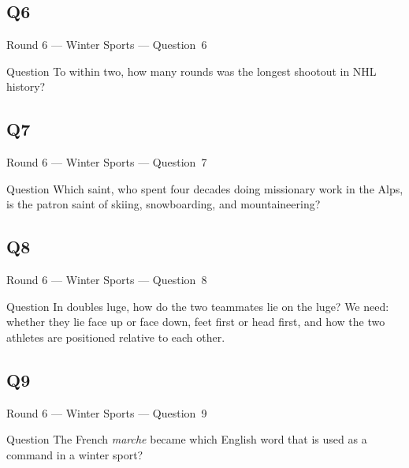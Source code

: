 \documentclass[11pt]{beamer}
\begin{document}
\subsection*{Q6}
\begin{frame}[t]{Round 6 --- Winter Sports --- \mbox{Question 6}}
    \vspace{-0.5em}
    \begin{block}{Question}
        To within two, how many rounds was the longest shootout in NHL history?
    \end{block}
\end{frame}
\subsection*{Q7}
\begin{frame}[t]{Round 6 --- Winter Sports --- \mbox{Question 7}}
    \vspace{-0.5em}
    \begin{block}{Question}
        Which saint, who spent four decades doing missionary work in the Alps, is the patron saint of skiing, snowboarding, and mountaineering?
    \end{block}
\end{frame}
\subsection*{Q8}
\begin{frame}[t]{Round 6 --- Winter Sports --- \mbox{Question 8}}
    \vspace{-0.5em}
    \begin{block}{Question}
        In doubles luge, how do the two teammates lie on the luge? We need: whether they lie face up or face down, feet first or head first, and how the two athletes are positioned relative to each other.
    \end{block}
\end{frame}
\subsection*{Q9}
\begin{frame}[t]{Round 6 --- Winter Sports --- \mbox{Question 9}}
    \vspace{-0.5em}
    \begin{block}{Question}
        The French \emph{marche} became which English word that is used as a command in a winter sport?
    \end{block}
\end{frame}
\end{document}
